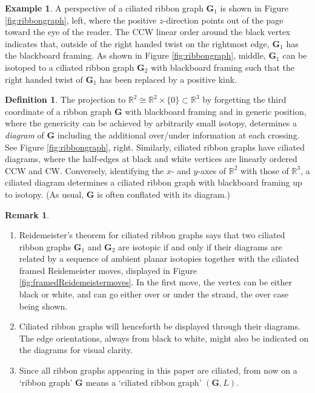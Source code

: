 \documentclass[12pt, reqno]{amsart}
\theoremstyle{definition}
\newtheorem{defi}[theo]{Definition}
\newtheorem{rema}[theo]{Remark}
\newtheorem{exam}[theo]{Example}
\newcommand{\R}{\mathbb{R}}%
\begin{document}
\begin{exam}
A perspective of a ciliated ribbon graph $\mathbf{G}_1$ is shown in Figure \ref{fig:ribbongraph}, left, where the positive $z$-direction points out of the page toward the eye of the reader.  The CCW linear order around the black vertex indicates that, outside of the right handed twist on the rightmost edge, $\mathbf{G}_1$ has the blackboard framing.  As shown in Figure \ref{fig:ribbongraph}, middle, $\mathbf{G}_1$ can be isotoped to a ciliated ribbon graph $\mathbf{G}_2$ with blackboard framing such that the right handed twist of $\mathbf{G}_1$ has been replaced by a positive kink.  
\end{exam}

\begin{defi}\label{defi:diagram}
The projection to $\R^2\cong\R^2\times\{0\}\subset\R^3$ by forgetting the third coordinate of a ribbon graph $\mathbf{G}$ with blackboard framing and in generic position, where the genericity can be achieved by arbitrarily small isotopy, determines a \emph{diagram} of $\mathbf{G}$ including the additional over/under information at each crossing.  See Figure \ref{fig:ribbongraph}, right.  Similarly, ciliated ribbon graphs have ciliated diagrams, where the half-edges at black and white vertices are linearly ordered CCW and CW.  Conversely, identifying the $x$- and $y$-axes of $\R^2$ with those of $\R^3$, a ciliated diagram determines a ciliated ribbon graph with blackboard framing up to isotopy.  (As usual, $\mathbf{G}$ is often conflated with its diagram.)
\end{defi}

\begin{rema}\label{rema:ribbongraphequalsciliatedribbongraph}
\begin{enumerate}
\item
Reidemeister's theorem for ciliated ribbon graphs \cite{fs22, sikora1} says that two ciliated ribbon graphs $\mathbf{G}_1$ and $\mathbf{G}_2$ are isotopic if and only if their diagrams are related by a sequence of ambient planar isotopies together with the ciliated framed Reidemeister moves, displayed in Figure \ref{fig:framedReidemeistermoves}.  In the first move, the vertex can be either black or white, and can go either over or under the strand, the over case being shown.
\item
Ciliated ribbon graphs will henceforth be displayed through their diagrams.  The edge orientations, always from black to white, might also be indicated on the diagrams for visual clarity.
\item\label{item:rema:ribbongraphequalsciliatedribbongraph}
Since all ribbon graphs appearing in this paper are ciliated, from now on a `ribbon graph' $\mathbf{G}$ means a `ciliated ribbon graph' $(\mathbf{G},L)$.  
\end{enumerate}
\end{rema}
\end{document}
